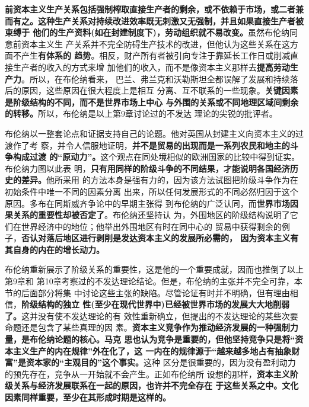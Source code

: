 \textbf{前资本主义生产关系包括强制榨取直接生产者的剩余，或不依赖于市场，或二者兼
  而有之。这种生产关系对持续改进效率既无刺激又无强制，并且如果直接生产者被束缚于
  他们的生产资料(如在封建制度下)，劳动组织就不易改变。}虽然布伦纳同意前资本主义生
产关系并不完全防碍生产技术的改进，但他认为这些关系在这方面不产生\textbf{有体系的
  趋势}。相反，财产所有者被引向专注于靠延长工作日或削减直接生产者的收入的方式来增
加他们的收入，而不是像资本主义那样去\textbf{提高劳动生产力}。所以，在布伦纳看来，
巴兰、弗兰克和沃勒斯坦全都误解了发展和持续落后的原因，这些原因在很大程度上是相互
分离、互不联系的一些现象。\textbf{关键因素是阶级结构的不同，而不是世界市场上中心
  与外围的关系或不同地理区域间剩余的转移。}所以，布伦纳是以上第9章讨论过的不发达
理论的尖锐的批评者。

布伦纳以一整套论点和证据支持自己的论题。他对英国从封建主义向资本主义的过渡作了考
察，并令人信服地证明，\textbf{并不是贸易的出现而是一系列农民和地主的斗争构成过渡
  的“原动力”。}这个观点在同处境相似的欧洲国家的比较中得到证实。布伦纳力图以此表
明，\textbf{只有用同样的阶级斗争的不同结果，才能说明各国经济历史的差异。}他所采用
的方法本身是强有力的，因为该方法试图把阶级斗争作为在初始条件中唯一不同的因素分离
出来，所以任何发展形式的不同必然归因于这个原因。多布在同斯威齐争论中的早期主张得
到布伦纳的广泛认同，而\textbf{世界市场因果关系的重要性却被否定了}。布伦纳还坚持认
为，外围地区的阶级结构说明了它们在世界经济中的地位；他举出外围地区有时在同中心的
贸易中获得剩余的例子，\textbf{否认对落后地区进行剥削是发达资本主义的发展所必需的，
  因为资本主义有其自身的内在的增长动力。}

布伦纳重新展示了阶级关系的重要性，这是他的一个重要成就，因而也推倒了以上第9章和
第10章考察过的不发达理论结论。但是，布伦纳的主张并不完全可靠，本节的后面部分将集
中讨论这些主张的缺陷。尽管论证有时并不明确，但有理由相信，\textbf{阶级结构的独立
  性(至少在现代世界中)已经被世界市场的发展大大地削弱了。}这并没有使不发达理论的有
效性重新确立，但提出的不发达理论的某些次要命题还是包含了某些真理的因
素。\textbf{资本主义竞争作为推动经济发展的一种强制力量，是布伦纳论题的核心。马克
  思也认为竞争是重要的，但他坚持竞争只是将“资本主义生产的内在规律”外在化了，这
  一内在的规律源于“越来越多地占有抽象财富”是资本家的“主观目的”这个事实。}这种
区分是很重要的，因为没有盈利动力的预先存在，竞争从一开始就不会产生。正如布伦纳所
设想的那样，\textbf{资本主义阶级关系与经济发展联系在一起的原因，也许并不完全存在
  于这些关系之中。文化因素同样重要，至少在其形成时期是这样的。}

